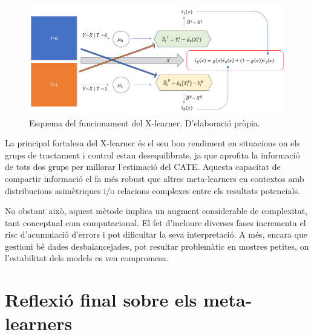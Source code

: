\documentclass[../main.tex]{subfiles}
\begin{document}
    \begin{figure}[H]
        \centering
        \includegraphics[width=0.8\linewidth]{imgs/x-learner.png}
        \caption{Esquema del funcionament del X-learner. D'elaboració pròpia.}
        \label{fig:xl}
    \end{figure}

    La principal fortalesa del X-learner és el seu bon rendiment en situacions on els grups de tractament i control estan desequilibrats, ja que aprofita la informació de tots dos grups per millorar l’estimació del CATE. Aquesta capacitat de compartir informació el fa més robust que altres meta-learners en contextos amb distribucions asimètriques i/o relacions complexes entre els resultats potencials.\par
    No obstant això, aquest mètode implica un augment considerable de complexitat, tant conceptual com computacional. El fet d’incloure diverses fases incrementa el risc d’acumulació d’errors i pot dificultar la seva interpretació. A més, encara que gestioni bé dades desbalancejades, pot resultar problemàtic en mostres petites, on l'estabilitat dels models es veu compromesa.


\section{Reflexió final sobre els meta-learners} \label{sec:refmeta}
\end{document}
